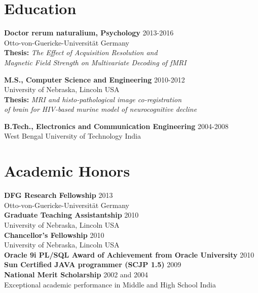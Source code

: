 \documentclass[line, margin]{res}
\begin{document}
\begin{resume}
\section{Education}

\textbf{Doctor rerum naturalium, Psychology} \hfill 2013-2016\\ 
Otto-von-Guericke-Universit\"{a}t \hfill Germany\\
\small\textbf{Thesis:} \textit{The Effect of Acquisition Resolution and\\
Magnetic Field Strength on Multivariate Decoding of fMRI}

\textbf{M.S., Computer Science and Engineering} \hfill 2010-2012\\
University of Nebraska, Lincoln \hfill USA\\
\small\textbf{Thesis:} \textit{MRI and histo-pathological image co-registration\\ 
of brain for HIV-based murine model of neurocognitive decline}

\textbf{B.Tech., Electronics and Communication Engineering} \hfill 2004-2008\\
West Bengal University of Technology \hfill India\\



\section{Academic Honors}
\textbf{DFG Research Fellowship} \hfill 2013\\
Otto-von-Guericke-Universit\"{a}t \hfill Germany\\

\textbf{Graduate Teaching Assistantship} \hfill 2010\\
University of Nebraska, Lincoln \hfill USA\\

\textbf{Chancellor's Fellowship} \hfill 2010\\
University of Nebraska, Lincoln \hfill USA\\

\textbf{Oracle 9i PL/SQL Award of Achievement from Oracle University} \hfill 2010\\

\textbf{Sun Certified JAVA programmer (SCJP 1.5)} \hfill 2009\\

\textbf{National Merit Scholarship} \hfill 2002 and 2004\\
Exceptional academic performance in Middle and High School \hfill India\\




\end{resume}
\end{document}
